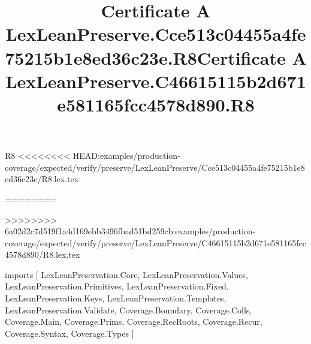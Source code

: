 \begin{lexlean}{R8}
<<<<<<<< HEAD:examples/production-coverage/expected/verify/preserve/LexLeanPreserve/Cce513c04455a4fe75215b1e8ed36c23e/R8.lex.tex
\title{Certificate A LexLeanPreserve.Cce513c04455a4fe75215b1e8ed36c23e.R8}
========
\title{Certificate A LexLeanPreserve.C46615115b2d671e581165fcc4578d890.R8}
>>>>>>>> 6a02d2c7d519f1a4d169ebb3496fbad51bd259cb:examples/production-coverage/expected/verify/preserve/LexLeanPreserve/C46615115b2d671e581165fcc4578d890/R8.lex.tex
\begin{coremodule}
imports [
  LexLeanPreservation.Core,
  LexLeanPreservation.Values,
  LexLeanPreservation.Primitives,
  LexLeanPreservation.Fixed,
  LexLeanPreservation.Keys,
  LexLeanPreservation.Templates,
  LexLeanPreservation.Validate,
  Coverage.Boundary,
  Coverage.Colls,
  Coverage.Main,
  Coverage.Prims,
  Coverage.RecRoots,
  Coverage.Recur,
  Coverage.Syntax,
  Coverage.Types
]


\end{coremodule}
\end{lexlean}
